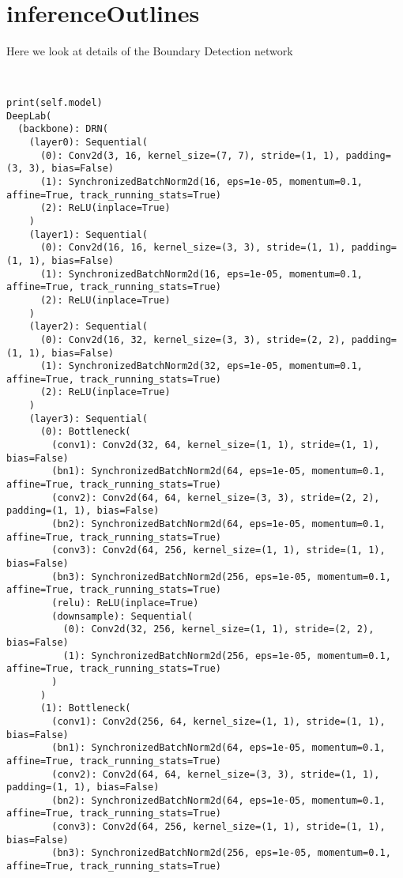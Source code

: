 \section{inferenceOutlines}

Here we look at details of the Boundary Detection network
\begin{verbatim}


print(self.model)
DeepLab(
  (backbone): DRN(
    (layer0): Sequential(
      (0): Conv2d(3, 16, kernel_size=(7, 7), stride=(1, 1), padding=(3, 3), bias=False)
      (1): SynchronizedBatchNorm2d(16, eps=1e-05, momentum=0.1, affine=True, track_running_stats=True)
      (2): ReLU(inplace=True)
    )
    (layer1): Sequential(
      (0): Conv2d(16, 16, kernel_size=(3, 3), stride=(1, 1), padding=(1, 1), bias=False)
      (1): SynchronizedBatchNorm2d(16, eps=1e-05, momentum=0.1, affine=True, track_running_stats=True)
      (2): ReLU(inplace=True)
    )
    (layer2): Sequential(
      (0): Conv2d(16, 32, kernel_size=(3, 3), stride=(2, 2), padding=(1, 1), bias=False)
      (1): SynchronizedBatchNorm2d(32, eps=1e-05, momentum=0.1, affine=True, track_running_stats=True)
      (2): ReLU(inplace=True)
    )
    (layer3): Sequential(
      (0): Bottleneck(
        (conv1): Conv2d(32, 64, kernel_size=(1, 1), stride=(1, 1), bias=False)
        (bn1): SynchronizedBatchNorm2d(64, eps=1e-05, momentum=0.1, affine=True, track_running_stats=True)
        (conv2): Conv2d(64, 64, kernel_size=(3, 3), stride=(2, 2), padding=(1, 1), bias=False)
        (bn2): SynchronizedBatchNorm2d(64, eps=1e-05, momentum=0.1, affine=True, track_running_stats=True)
        (conv3): Conv2d(64, 256, kernel_size=(1, 1), stride=(1, 1), bias=False)
        (bn3): SynchronizedBatchNorm2d(256, eps=1e-05, momentum=0.1, affine=True, track_running_stats=True)
        (relu): ReLU(inplace=True)
        (downsample): Sequential(
          (0): Conv2d(32, 256, kernel_size=(1, 1), stride=(2, 2), bias=False)
          (1): SynchronizedBatchNorm2d(256, eps=1e-05, momentum=0.1, affine=True, track_running_stats=True)
        )
      )
      (1): Bottleneck(
        (conv1): Conv2d(256, 64, kernel_size=(1, 1), stride=(1, 1), bias=False)
        (bn1): SynchronizedBatchNorm2d(64, eps=1e-05, momentum=0.1, affine=True, track_running_stats=True)
        (conv2): Conv2d(64, 64, kernel_size=(3, 3), stride=(1, 1), padding=(1, 1), bias=False)
        (bn2): SynchronizedBatchNorm2d(64, eps=1e-05, momentum=0.1, affine=True, track_running_stats=True)
        (conv3): Conv2d(64, 256, kernel_size=(1, 1), stride=(1, 1), bias=False)
        (bn3): SynchronizedBatchNorm2d(256, eps=1e-05, momentum=0.1, affine=True, track_running_stats=True)

\end{verbatim}
